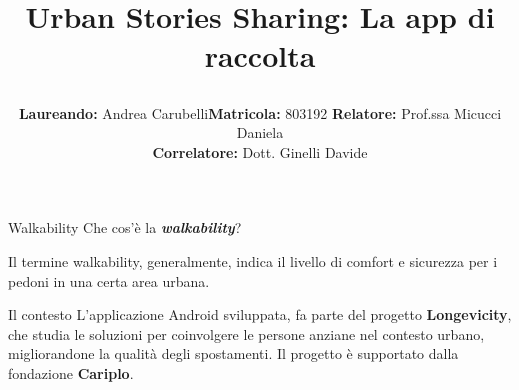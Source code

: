 \documentclass[11pt,aspectratio=169]{beamer}
\title{\centerline{\LARGE{Urban Stories Sharing: La app di raccolta}}}
\date{}
\author{\textbf{Laureando:} Andrea Carubelli\newline \textbf{Matricola:} 803192 \newline \newline \textbf{Relatore:} Prof.ssa Micucci Daniela\\ \textbf{Correlatore:} Dott. Ginelli Davide}
\begin{document}
\maketitle


\begin{frame}{Walkability}
   Che cos'è la \textit{\textbf{walkability}}?
    
    \begin{center}\large{Il termine walkability, generalmente, indica il livello di comfort e sicurezza per i pedoni in una certa area urbana.}
    \end{center}

\end{frame}

\begin{frame}{Il contesto}
L'applicazione Android sviluppata, fa parte del progetto \textbf{Longevicity}, che studia le soluzioni per coinvolgere le persone anziane nel contesto urbano, migliorandone la qualità degli spostamenti. Il progetto è supportato dalla fondazione \textbf{Cariplo}.
    
\end{frame}
\end{document}
